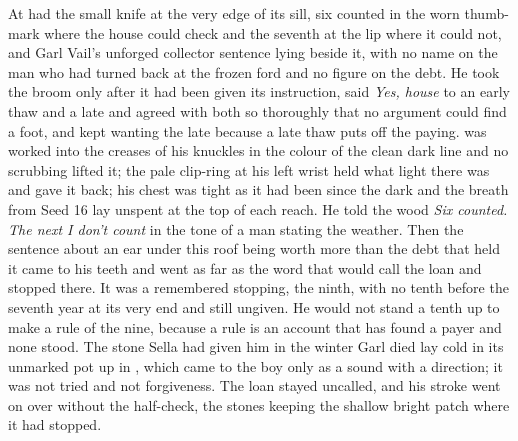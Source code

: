 At   had the small knife at the very edge of its sill, six counted in the worn thumb-mark where the house could check and the seventh at the lip where it could not, and Garl Vail's unforged collector sentence lying beside it, with no name on the man who had turned back at the frozen ford and no figure on the debt. He took the broom only after it had been given its instruction, said \emph{Yes, house} to an early thaw and a late and agreed with both so thoroughly that no argument could find a foot, and kept wanting the late because a late thaw puts off the paying.  was worked into the creases of his knuckles in the colour of the clean dark line and no scrubbing lifted it; the pale clip-ring at his left wrist held what light there was and gave it back; his chest was tight as it had been since the dark and the breath from Seed 16 lay unspent at the top of each reach. He told the wood \emph{Six counted. The next I don't count} in the tone of a man stating the weather. Then the sentence about an ear under this roof being worth more than the debt that held it came to his teeth and went as far as the word that would call the loan and stopped there. It was a remembered stopping, the ninth, with no tenth before the seventh year at its very end and still ungiven. He would not stand a tenth up to make a rule of the nine, because a rule is an account that has found a payer and none stood. The stone Sella had given him in the winter Garl died lay cold in its unmarked pot up in , which came to the boy only as a sound with a direction; it was not tried and not forgiveness. The loan stayed uncalled, and his stroke went on over  without the half-check, the stones keeping the shallow bright patch where it had stopped.

